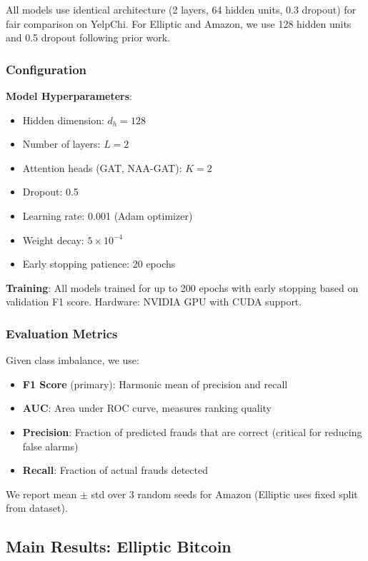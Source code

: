 All models use identical architecture (2 layers, 64 hidden units, 0.3 dropout) for fair comparison on YelpChi. For Elliptic and Amazon, we use 128 hidden units and 0.5 dropout following prior work.

\subsubsection{Configuration}

\textbf{Model Hyperparameters}:
\begin{itemize}
\item Hidden dimension: $d_h = 128$
\item Number of layers: $L = 2$
\item Attention heads (GAT, NAA-GAT): $K = 2$
\item Dropout: 0.5
\item Learning rate: 0.001 (Adam optimizer)
\item Weight decay: $5 \times 10^{-4}$
\item Early stopping patience: 20 epochs
\end{itemize}

\textbf{Training}: All models trained for up to 200 epochs with early stopping based on validation F1 score. Hardware: NVIDIA GPU with CUDA support.

\subsubsection{Evaluation Metrics}

Given class imbalance, we use:
\begin{itemize}
\item \textbf{F1 Score} (primary): Harmonic mean of precision and recall
\item \textbf{AUC}: Area under ROC curve, measures ranking quality
\item \textbf{Precision}: Fraction of predicted frauds that are correct (critical for reducing false alarms)
\item \textbf{Recall}: Fraction of actual frauds detected
\end{itemize}

We report mean $\pm$ std over 3 random seeds for Amazon (Elliptic uses fixed split from dataset).

\subsection{Main Results: Elliptic Bitcoin}

